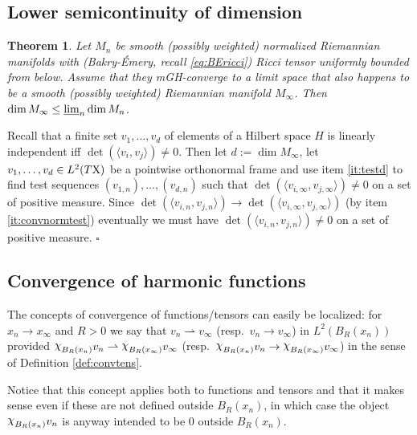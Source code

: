 \documentclass[11pt]{article}
\numberwithin{equation}{section}
\newtheorem{theorem}{Theorem}[section]
\newenvironment{idea}{\removelastskip\par\medskip   %
\noindent{\em Idea of the proof} \rm}{\penalty-20\null\hfill$\square$\par\medbreak}
\newcommand{\X}{{\rm X}}
\newcommand{\sfd}{{\sf d}}
\newcommand{\limi}{\varliminf}
\newcommand{\weakto}{\rightharpoonup}
\newcommand{\nchi}{{\raise.3ex\hbox{$\chi$}}}
\newcommand\la{\langle}
\newcommand\ra{\rangle}
\begin{document}
\subsection{Lower semicontinuity of  dimension}
\begin{theorem}\label{thm:lscdim}
Let $M_n$ be smooth (possibly weighted) normalized Riemannian manifolds with (Bakry-\'Emery, recall \eqref{eq:BEricci}) Ricci tensor uniformly bounded from below. Assume that they mGH-converge to a limit space that also happens to be a smooth  (possibly weighted) Riemannian manifold $M_\infty$. Then $\dim M_\infty\leq \limi_n\dim M_n$.
\end{theorem}
\begin{idea}
Recall that a finite set $v_1,\ldots,v_d$ of elements of a Hilbert space $H$ is linearly independent iff $\det(\la v_i,v_j\ra)\neq 0$. Then let $d:=\dim M_\infty$, let $v_1,\ldots,v_d\in L^2(T\X)$ be a pointwise orthonormal frame and use item  \ref{it:testd}  to find test sequences $(v_{1,n}),\ldots,(v_{d,n})$ such that $\det(\la v_{i,\infty},v_{j,\infty}\ra)\neq 0$ on a set of positive measure. Since $\det(\la v_{i,n},v_{j,n}\ra)\to \det(\la v_{i,\infty},v_{j,\infty}\ra)$ (by item \ref{it:convnormtest}) eventually we must have $\det(\la v_{i,n},v_{j,n}\ra)\neq0 $ on a set of positive measure.
\end{idea}
\subsection{Convergence of harmonic functions}\label{se:convharm}
The concepts of convergence of functions/tensors can easily be localized: for  $x_n\to x_\infty$ and $R>0$ we say that $v_n\weakto v_\infty$ (resp.\ $v_n\to v_\infty$) in $L^2(B_R(x_n))$ provided $\nchi_{B_R(x_n)}v_n\weakto \nchi_{B_R(x_\infty)}v_\infty$ (resp.\ $\nchi_{B_R(x_n)}v_n\to \nchi_{B_R(x_\infty)}v_\infty$) in the sense of Definition \ref{def:convtens}. %

Notice that this concept applies both to functions and tensors and that it makes sense even if these are not defined outside $B_R(x_n)$, in which case the object $\nchi_{B_R(x_n)}v_n$ is anyway intended to be 0 outside $B_R(x_n)$.
\end{document}
